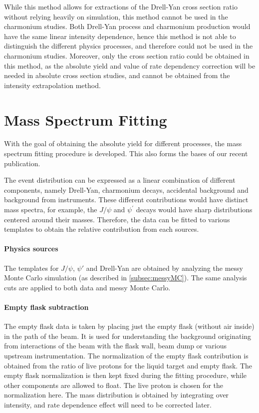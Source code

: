 \documentclass[../main.tex]{subfiles}
\begin{document}


While this method allows for extractions of the Drell-Yan cross section ratio without relying
heavily on simulation, this method cannot be used in the charmonium studies.
Both Drell-Yan process and charmonium production would have the same linear intensity dependence,
hence this method is not able to distinguish the different physics processes, and therefore could
not be used in the charmonium studies. Moreover, only the cross section ratio could be obtained in
this method, as the absolute yield and value of rate dependency correction will be needed in
absolute cross section studies, and cannot be obtained from the intensity extrapolation method.

\section{Mass Spectrum Fitting}
With the goal of obtaining the absolute yield for different processes, the mass spectrum fitting
procedure is developed. This also forms the bases of our recent publication\cite{dove2023}.

The event distribution can be expressed as a linear combination of different components,
namely Drell-Yan, charmonium decays, accidental background and background from instruments.
These different contributions would have distinct mass spectra, for example, the $J/\psi$
and $\psi^\prime$ decays would have sharp distributions centered around their masses.
Therefore, the data can be fitted to various templates to obtain
the relative contribution from each sources.

\paragraph{Physics sources}
The templates for $J/\psi$, $\psi'$ and Drell-Yan are obtained by analyzing the messy Monte Carlo
simulation (as described in \cref{subsec:messyMC}). The same analysis cuts are applied to both data
and messy Monte Carlo.

\paragraph{Empty flask subtraction}
The empty flask data is taken by placing just the empty flask (without air inside) in the path of
the beam. It is used for understanding the background originating from interactions of the beam
with the flask wall, beam dump or various upstream instrumentation. The normalization of the
empty flask contribution is obtained from the ratio of live protons for the liquid target and
empty flask. The empty flask normalization is then kept fixed during the fitting procedure, while
other components are allowed to float. The live proton is chosen for the normalization here. The
mass distribution is obtained by integrating over intensity, and rate dependence effect will need
to be corrected later.
\end{document}
